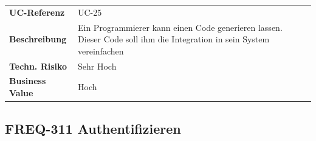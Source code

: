 \begin{longtable}[c]{@{}ll@{}}
\toprule
\begin{minipage}[t]{0.20\columnwidth}\raggedright\strut
\textbf{UC-Referenz}
\strut\end{minipage} &
\begin{minipage}[t]{0.74\columnwidth}\raggedright\strut
UC-25
\strut\end{minipage}\tabularnewline
\begin{minipage}[t]{0.20\columnwidth}\raggedright\strut
\textbf{Beschreibung}
\strut\end{minipage} &
\begin{minipage}[t]{0.74\columnwidth}\raggedright\strut
Ein Programmierer kann einen Code generieren lassen. Dieser Code soll
ihm die Integration in sein System vereinfachen
\strut\end{minipage}\tabularnewline
\begin{minipage}[t]{0.20\columnwidth}\raggedright\strut
\textbf{Techn. Risiko}
\strut\end{minipage} &
\begin{minipage}[t]{0.74\columnwidth}\raggedright\strut
Sehr Hoch
\strut\end{minipage}\tabularnewline
\begin{minipage}[t]{0.20\columnwidth}\raggedright\strut
\textbf{Business Value}
\strut\end{minipage} &
\begin{minipage}[t]{0.74\columnwidth}\raggedright\strut
Hoch
\strut\end{minipage}\tabularnewline
\bottomrule
\end{longtable}

\subsection{FREQ-311 Authentifizieren}\label{freq-311-authentifizieren}

